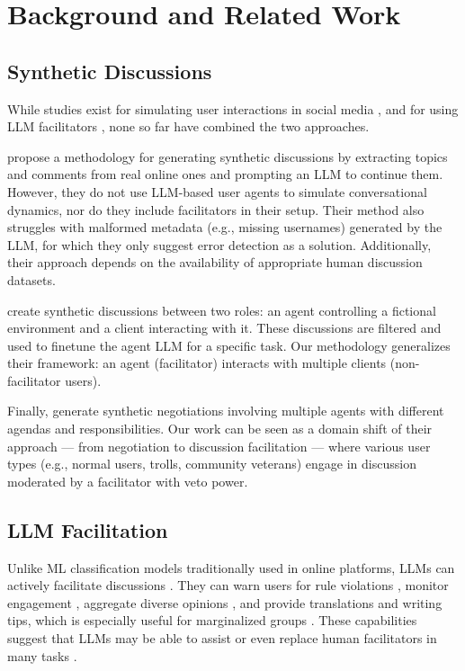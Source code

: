 %
\section{Background and Related Work}

\subsection{Synthetic Discussions}
\label{ssec:related:discussions}

While studies exist for simulating user interactions in social media \cite{park_simulacra, mou_2024, tornberg_2023, y_social, balog_2024}, and for using \ac{LLM} facilitators \cite{kim_et_al_chatbot, cho-etal-2024-language}, none so far have combined the two approaches. 


\citet{balog_2024} propose a methodology for generating synthetic discussions by extracting topics and comments from real online ones and prompting an \ac{LLM} to continue them. However, they do not use \ac{LLM}-based user agents to simulate conversational dynamics, nor do they include facilitators in their setup. Their method also struggles with malformed metadata (e.g., missing usernames) generated by the \ac{LLM}, for which they only suggest error detection as a solution. Additionally, their approach depends on the availability of appropriate human discussion datasets.

\citet{ulmer2024} create synthetic discussions between two roles: an agent controlling a fictional environment and a client interacting with it. These discussions are filtered and used to finetune the agent LLM for a specific task. Our methodology generalizes their framework: an agent (facilitator) interacts with multiple clients (non-facilitator users).

Finally, \citet{abdelnabi_negotiations} generate synthetic negotiations involving multiple agents with different agendas and responsibilities. Our work can be seen as a domain shift of their approach --- from negotiation to discussion facilitation --- where various user types (e.g., normal users, trolls, community veterans) engage in discussion moderated by a facilitator with veto power.


\subsection{LLM Facilitation}

Unlike \ac{ML} classification models traditionally used in online platforms, \acp{LLM} can actively facilitate discussions \cite{korre2025evaluation}. They can warn users for rule violations \cite{Kumar_AbuHashem_Durumeric_2024}, monitor engagement \cite{schroeder-etal-2024-fora}, aggregate diverse opinions \cite{small-polis-llm}, and provide translations and writing tips, which is especially useful for marginalized groups \cite{Tsai2024Generative}. These capabilities suggest that \acp{LLM} may be able to assist or even replace human facilitators in many tasks \cite{small-polis-llm, seering_self_moderation}.


